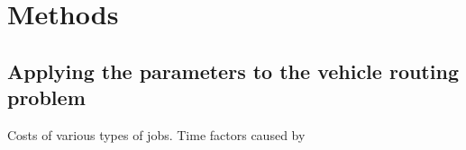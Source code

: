 \chapter{Methods}
\label{chapter:methods}



\section{Applying the parameters to the vehicle routing problem}

Costs of various types of jobs. Time factors caused by 